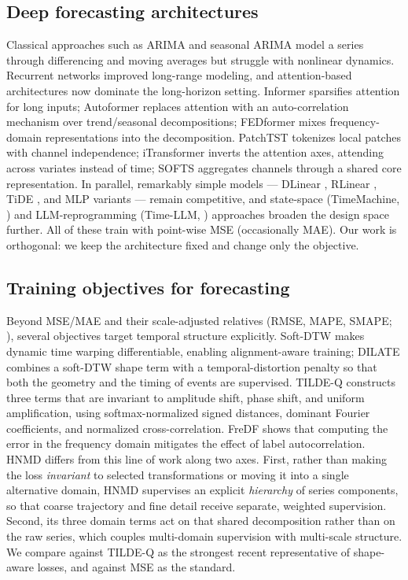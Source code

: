 \documentclass[11pt,twocolumn]{article}
\newcommand{\methodName}{HNMD\xspace}
\begin{document}
\subsection{Deep forecasting architectures}
Classical approaches such as ARIMA and seasonal ARIMA \citep{arima,seasonalarima} model a series through differencing and moving averages but struggle with nonlinear dynamics. Recurrent networks \citep{rnn,lstm,gru} improved long-range modeling, and attention-based architectures now dominate the long-horizon setting. Informer \citep{informer} sparsifies attention for long inputs; Autoformer \citep{autoformer} replaces attention with an auto-correlation mechanism over trend/seasonal decompositions; FEDformer \citep{fedformer} mixes frequency-domain representations into the decomposition. PatchTST \citep{patchtst} tokenizes local patches with channel independence; iTransformer \citep{itransformer} inverts the attention axes, attending across variates instead of time; SOFTS \citep{softs} aggregates channels through a shared core representation. In parallel, remarkably simple models --- DLinear \citep{dlinear}, RLinear \citep{rlinear}, TiDE \citep{tide}, and MLP variants --- remain competitive, and state-space (TimeMachine, \citealp{timemachine}) and LLM-reprogramming (Time-LLM, \citealp{TimeLLM}) approaches broaden the design space further. All of these train with point-wise MSE (occasionally MAE). Our work is orthogonal: we keep the architecture fixed and change only the objective.

\subsection{Training objectives for forecasting}
Beyond MSE/MAE and their scale-adjusted relatives (RMSE, MAPE, SMAPE; \citealp{mape}), several objectives target temporal structure explicitly. Soft-DTW \citep{softdtw} makes dynamic time warping differentiable, enabling alignment-aware training; DILATE \citep{dilate} combines a soft-DTW shape term with a temporal-distortion penalty so that both the geometry and the timing of events are supervised. TILDE-Q \citep{tilde-q} constructs three terms that are invariant to amplitude shift, phase shift, and uniform amplification, using softmax-normalized signed distances, dominant Fourier coefficients, and normalized cross-correlation. FreDF \citep{fredf} shows that computing the error in the frequency domain mitigates the effect of label autocorrelation. \methodName differs from this line of work along two axes. First, rather than making the loss \emph{invariant} to selected transformations or moving it into a single alternative domain, \methodName supervises an explicit \emph{hierarchy} of series components, so that coarse trajectory and fine detail receive separate, weighted supervision. Second, its three domain terms act on that shared decomposition rather than on the raw series, which couples multi-domain supervision with multi-scale structure. We compare against TILDE-Q as the strongest recent representative of shape-aware losses, and against MSE as the standard.
\end{document}
